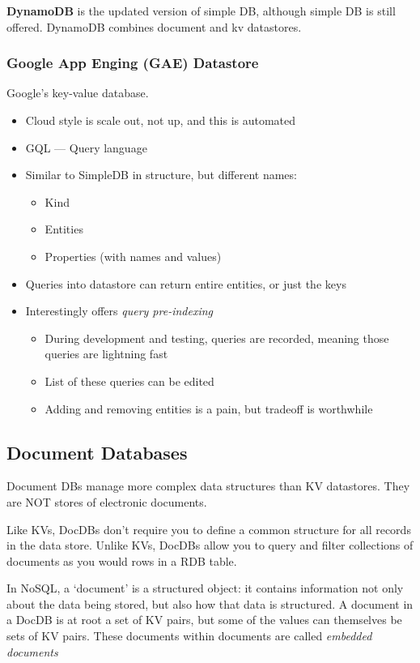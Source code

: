 \documentclass[11pt,a4paper,titlepage,dvipsnames,cmyk]{scrartcl}
\begin{document}
\textbf{DynamoDB} is the updated version of simple DB, although simple DB is still offered. DynamoDB combines document and kv datastores.

\subsubsection{Google App Enging (GAE) Datastore}
Google's key-value database.
\begin{itemize}
    \item Cloud style is scale out, not up, and this is automated
    \item GQL --- Query language
    \item Similar to SimpleDB in structure, but different names:
    \begin{itemize}
        \item Kind
        \item Entities
        \item Properties (with names and values)
    \end{itemize}
    \item Queries into datastore can return entire entities, or just the keys 
    \item Interestingly offers \textit{query pre-indexing}
    \begin{itemize}
        \item During development and testing, queries are recorded, meaning those queries are lightning fast
        \item List of these queries can be edited
        \item Adding and removing entities is a pain, but tradeoff is worthwhile
    \end{itemize}
\end{itemize}

\subsection{Document Databases}
Document DBs manage more complex data structures than KV datastores. They are NOT stores of electronic documents.

Like KVs, DocDBs don't require you to define a common structure for all records in the data store. Unlike KVs, DocDBs allow you to query and filter collections of documents as you would rows in a RDB table.

In NoSQL, a `document' is a structured object: it contains information not only about the data being stored, but also how that data is structured. A document in a DocDB is at root a set of KV pairs, but some of the values can themselves be sets of KV pairs. These documents within documents are called \textit{embedded documents}
\end{document}
